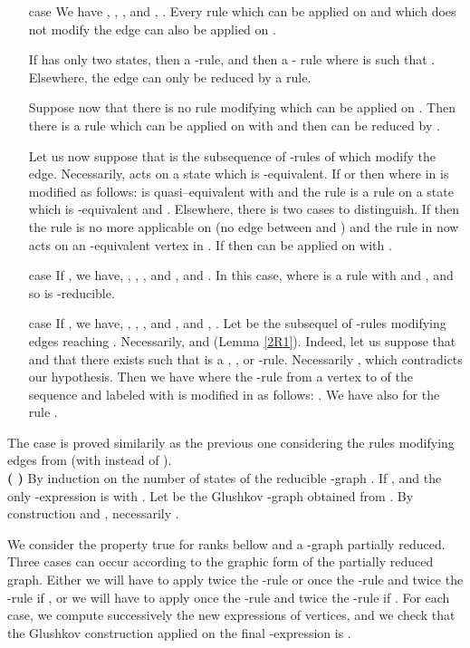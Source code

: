 \documentclass[11pt]{article}
\begin{document}
\begin{itemize}
\item[case ] We have , , ,  and , . Every rule which can be applied on  and which does not modify the edge  can also be applied on . 

If  has only two states, then  a -rule, and then  a - rule where  is such that . Elsewhere, the  edge can only be reduced by a  rule. 

Suppose now that  there is no  rule modifying  which can be applied on . Then there is a  rule  which can be applied on  with  and then   can be reduced by .

Let us now suppose that  is the subsequence of -rules of  which modify the  edge. Necessarily,  acts on a state  which is -equivalent. If  or  then  where  in  is modified  as follows:  is quasi--equivalent with  and the rule  is a  rule on a state  which is -equivalent and . Elsewhere, there is two cases to distinguish. If  then the  rule is no more applicable on  (no edge between  and ) and the  rule in  now acts on an  -equivalent  vertex in . If  then  can be applied on  with .
\item[case ] If , we have, , , ,  and ,  and . In this case,  where  is a  rule with  and ,  and so  is -reducible.
\item[case ]  If , we have, , , ,  and ,  and , .
Let  be the subsequel of -rules modifying edges reaching . Necessarily,  and  (Lemma \ref{2R1}).
Indeed, let us suppose that  and that there exists  such that  is a , , or -rule. Necessarily  , which contradicts our hypothesis. Then we have  where  the -rule from a vertex  to   of the sequence  and labeled with  is modified in  as follows: . We have also  for the rule .


\end{itemize}
The case  is proved similarily as the previous one considering the rules modifying edges from  (with  instead of ). \\

\noindent
{\bf (  )} By induction on the number of states of the reducible -graph .
If ,  and the only -expression  is
 with . Let  be the Glushkov
-graph obtained from . By construction
 and , necessarily .

We consider the property true for ranks bellow  and  a
-graph partially reduced.
Three cases can occur according to the graphic form of the partially
reduced graph.
Either we will have to apply twice the -rule or once the -rule and twice the -rule if , or we will
have to apply once the -rule and twice the -rule if
. For each case, we compute successively the new
expressions of vertices, and we check that the Glushkov
construction applied on the final -expression is .
\cqfd
\end{document}
